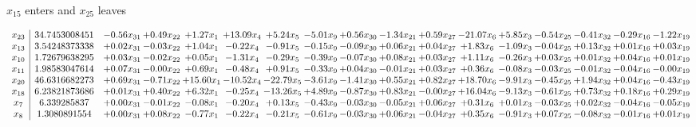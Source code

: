 \documentclass[9pt]{article}
\begin{document}
 $ x_{15} $ enters and $ x_{25} $ leaves 

 \[\begin{array}{c| c c@{\hskip 2pt} c@{\hskip 2pt} c@{\hskip 2pt} c@{\hskip 2pt} c@{\hskip 2pt} c@{\hskip 2pt} c@{\hskip 2pt} c@{\hskip 2pt} c@{\hskip 2pt} c@{\hskip 2pt} c@{\hskip 2pt} c@{\hskip 2pt} c@{\hskip 2pt} c@{\hskip 2pt} c@{\hskip 2pt} }
 x_{23}   &  34.7453008451 & -0.56 x_{31} & +  0.49 x_{22} & +  1.27 x_{1} & + 13.09 x_{4} & +  5.24 x_{5} & -5.01 x_{9} & +  0.56 x_{30} & -1.34 x_{21} & +  0.59 x_{27} & -21.07 x_{6} & +  5.85 x_{3} & -0.54 x_{25} & -0.41 x_{32} & -0.29 x_{16} & -1.22 x_{19}\\
 x_{13}   &  3.54248373338 & +  0.02 x_{31} & -0.03 x_{22} & +  1.04 x_{1} & -0.22 x_{4} & -0.91 x_{5} & -0.15 x_{9} & -0.09 x_{30} & +  0.06 x_{21} & +  0.04 x_{27} & +  1.83 x_{6} & -1.09 x_{3} & -0.04 x_{25} & +  0.13 x_{32} & +  0.01 x_{16} & +  0.03 x_{19}\\
 x_{10}   &  1.72679638295 & +  0.03 x_{31} & -0.02 x_{22} & +  0.05 x_{1} & -1.31 x_{4} & -0.29 x_{5} & -0.39 x_{9} & -0.07 x_{30} & +  0.08 x_{21} & +  0.03 x_{27} & +  1.11 x_{6} & -0.26 x_{3} & +  0.03 x_{25} & +  0.01 x_{32} & +  0.04 x_{16} & +  0.01 x_{19}\\
 x_{11}   &  1.98583047614 & +  0.07 x_{31} & -0.00 x_{22} & +  0.69 x_{1} & -0.48 x_{4} & +  0.91 x_{5} & -0.33 x_{9} & +  0.04 x_{30} & -0.01 x_{21} & +  0.03 x_{27} & +  0.36 x_{6} & -0.08 x_{3} & -0.03 x_{25} & -0.01 x_{32} & -0.04 x_{16} & -0.00 x_{19}\\
 x_{20}   &  46.6316682273 & +  0.69 x_{31} & -0.71 x_{22} & + 15.60 x_{1} & -10.52 x_{4} & -22.79 x_{5} & -3.61 x_{9} & -1.41 x_{30} & +  0.55 x_{21} & +  0.82 x_{27} & + 18.70 x_{6} & -9.91 x_{3} & -0.45 x_{25} & +  1.94 x_{32} & +  0.04 x_{16} & -0.43 x_{19}\\
 x_{18}   &  6.23821873686 & +  0.01 x_{31} & +  0.40 x_{22} & +  6.32 x_{1} & -0.25 x_{4} & -13.26 x_{5} & +  4.89 x_{9} & -0.87 x_{30} & +  0.83 x_{21} & -0.00 x_{27} & + 16.04 x_{6} & -9.13 x_{3} & -0.61 x_{25} & +  0.73 x_{32} & +  0.18 x_{16} & +  0.29 x_{19}\\
 x_{7}   &  6.339285837 & +  0.00 x_{31} & -0.01 x_{22} & -0.08 x_{1} & -0.20 x_{4} & +  0.13 x_{5} & -0.43 x_{9} & -0.03 x_{30} & -0.05 x_{21} & +  0.06 x_{27} & +  0.31 x_{6} & +  0.01 x_{3} & -0.03 x_{25} & +  0.02 x_{32} & -0.04 x_{16} & -0.05 x_{19}\\
 x_{8}   &  1.3080891554 & +  0.00 x_{31} & +  0.08 x_{22} & -0.77 x_{1} & -0.22 x_{4} & -0.21 x_{5} & -0.61 x_{9} & -0.03 x_{30} & +  0.06 x_{21} & -0.04 x_{27} & +  0.35 x_{6} & -0.91 x_{3} & +  0.07 x_{25} & -0.08 x_{32} & -0.01 x_{16} & +  0.01 x_{19}\\

\end{array}\]
\end{document}
